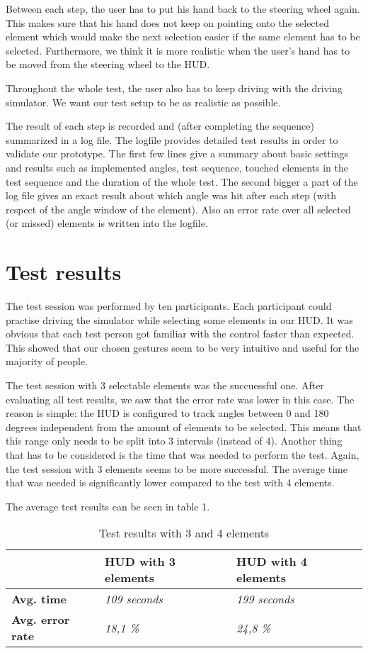 \documentclass{sigchi-ext}
\begin{document}
Between each step, the user has to put his hand back to the steering wheel again. This makes sure that his hand does not keep on pointing onto the selected element which would make the next selection easier if the same element has to be selected. Furthermore, we think it is more realistic when the user's hand has to be moved from the steering wheel to the HUD.

Throughout the whole test, the user also has to keep driving with the driving simulator. We want our test setup to be as realistic as possible. 

The result of each step is recorded and (after completing the sequence) summarized in a log file. The logfile provides detailed test results in order to validate our prototype. The first few lines give a summary about basic settings and results such as implemented angles, test sequence, touched elements in the test sequence and the duration of the whole test. The second bigger a part of the log file gives an exact result about which angle was hit after each step (with respect of the angle window of the element). Also an error rate over all selected (or missed) elements is written into the logfile.

\section{Test results}
The test session was performed by ten participants.  Each participant could practise driving the simulator while selecting some elements in our HUD. It was obvious that each test person got familiar with the control faster than expected. This showed that our chosen gestures seem to be very intuitive and useful for the majority of people.

The test session with 3 selectable elements was the succuessful one. After evaluating all test results, we saw that the error rate was lower in this case. The reason is simple: the HUD is configured to track angles between 0 and 180 degrees independent from the amount of elements to be selected. This means that this range only needs to be split into 3 intervals (instead of 4). Another thing that has to be considered is the time that was needed to perform the test. Again, the test session with 3 elements seems to be more successful. The average time that was needed is significantly lower compared to the test with 4 elements.

The average test results can be seen in table 1.
\begin{table}
\begin{tabular}{|l|l|l|}
\hline
  & \textbf{HUD with 3 elements} & \textbf{HUD with 4 elements} \\
\hline
\textbf{Avg. time} & \textit{109 seconds} & \textit{199 seconds} \\
\hline
\textbf{Avg. error rate} & \textit{18,1 \%} & \textit{24,8 \%} \\
\hline
\end{tabular}
\caption{Test results with 3 and 4 elements}
\end{table}
\end{document}
